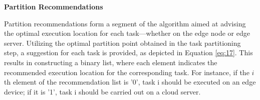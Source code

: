 \documentclass[preprint,12pt,authoryear]{elsarticle}
\begin{document}
\textbf{Partition Recommendations}

Partition recommendations form a segment of the algorithm aimed at advising the optimal execution location for each task—whether on the edge node or edge server. Utilizing the optimal partition point obtained in the task partitioning step, a suggestion for each task is provided, as depicted in Equation \ref{eq:17}. This results in constructing a binary list, where each element indicates the recommended execution location for the corresponding task. For instance, if the \(i\)th element of the recommendation list is '0', task i should be executed on an edge device; if it is '1', task i should be carried out on a cloud server.



\end{document}
